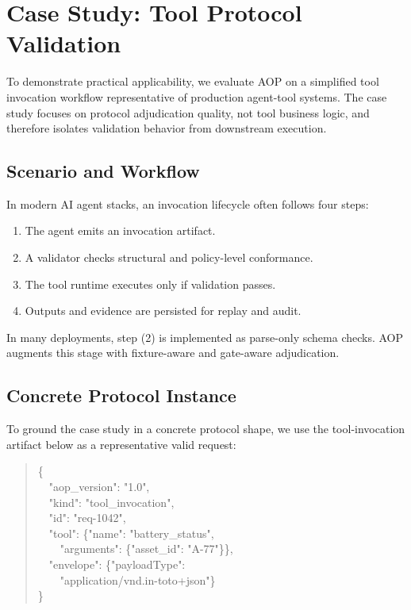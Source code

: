 \section{Case Study: Tool Protocol Validation}

To demonstrate practical applicability, we evaluate AOP on a simplified
tool invocation workflow representative of production agent-tool systems.
The case study focuses on protocol adjudication quality, not tool business
logic, and therefore isolates validation behavior from downstream execution.

\subsection{Scenario and Workflow}

In modern AI agent stacks, an invocation lifecycle often follows four steps:
\begin{enumerate}
\item The agent emits an invocation artifact.
\item A validator checks structural and policy-level conformance.
\item The tool runtime executes only if validation passes.
\item Outputs and evidence are persisted for replay and audit.
\end{enumerate}

In many deployments, step (2) is implemented as parse-only schema checks.
AOP augments this stage with fixture-aware and gate-aware adjudication.


\subsection{Concrete Protocol Instance}

To ground the case study in a concrete protocol shape, we use the
tool-invocation artifact below as a representative valid request:
\begin{quote}
\ttfamily
\{\\
\ \ "aop\_version": "1.0",\\
\ \ "kind": "tool\_invocation",\\
\ \ "id": "req-1042",\\
\ \ "tool": \{"name": "battery\_status",\\
\ \ \ \ "arguments": \{"asset\_id": "A-77"\}\},\\
\ \ "envelope": \{"payloadType":\\
\ \ \ \ "application/vnd.in-toto+json"\}\\
\}
\end{quote}

